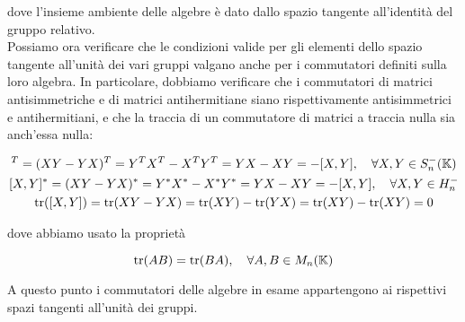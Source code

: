 {dove l'insieme ambiente delle algebre è dato dallo spazio tangente all'identità del gruppo relativo. \\
Possiamo ora verificare che le condizioni valide per gli elementi dello spazio tangente all'unità dei vari gruppi valgano anche per i commutatori definiti sulla loro algebra. In particolare, dobbiamo verificare che i commutatori di matrici antisimmetriche e di matrici antihermitiane siano rispettivamente antisimmetrici e antihermitiani, e che la traccia di un commutatore di matrici a traccia nulla sia anch'essa nulla:

\begin{gather}
	[X,Y]^{T} = (X Y - Y X)^{T} = Y^{T} X^{T} - X^{T} Y^{T} = Y X - X Y = - [X,Y] %
	\qcomma \forall X,Y \in S^{-}_{n}(\K) \\
	[X,Y]^{*} = (X Y - Y X)^{*} = Y^{*} X^{*} - X^{*} Y^{*} = Y X - X Y = - [X,Y] %
	\qcomma \forall X,Y \in H^{-}_{n} \\
	\tr([X,Y]) = \tr(X Y - Y X) = \tr(X Y) - \tr(Y X) = \tr(X Y) - \tr(X Y) = 0
\end{gather}

dove abbiamo usato la proprietà

\begin{equation}
	\tr(A B) = \tr(B A) \qcomma \forall A,B \in M_{n}(\K)
\end{equation}

A questo punto i commutatori delle algebre in esame appartengono ai rispettivi spazi tangenti all'unità dei gruppi.
}


